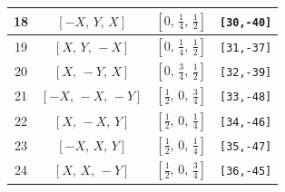 \documentclass[fleqn,8pt]{jsarticle}
\begin{document}
\begin{longtable}{cccc}
18 & $\left[ - X,\, Y,\, X \right]$ & $\left[ 0,\, \frac{1}{4},\, \frac{1}{2} \right]$ & {\tt [30,-40]} \\ \hline
19 & $\left[ X,\, Y,\, - X \right]$ & $\left[ 0,\, \frac{1}{4},\, \frac{1}{2} \right]$ & {\tt [31,-37]} \\ \hline
20 & $\left[ X,\, - Y,\, X \right]$ & $\left[ 0,\, \frac{3}{4},\, \frac{1}{2} \right]$ & {\tt [32,-39]} \\ \hline
21 & $\left[ - X,\, - X,\, - Y \right]$ & $\left[ \frac{1}{2},\, 0,\, \frac{3}{4} \right]$ & {\tt [33,-48]} \\ \hline
22 & $\left[ X,\, - X,\, Y \right]$ & $\left[ \frac{1}{2},\, 0,\, \frac{1}{4} \right]$ & {\tt [34,-46]} \\ \hline
23 & $\left[ - X,\, X,\, Y \right]$ & $\left[ \frac{1}{2},\, 0,\, \frac{1}{4} \right]$ & {\tt [35,-47]} \\ \hline
24 & $\left[ X,\, X,\, - Y \right]$ & $\left[ \frac{1}{2},\, 0,\, \frac{3}{4} \right]$ & {\tt [36,-45]} \\
\end{longtable}
\renewcommand{\arraystretch}{1.2}
\end{document}
